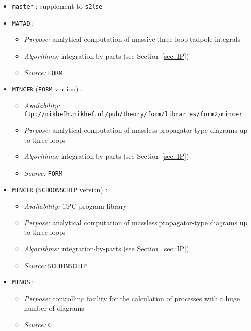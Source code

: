 \begin{itemize}

\item{\tt master} \cite{Bauetal}: supplement to {\tt s2lse}
    

\item {\tt MATAD} \cite{Stediss}:
  \begin{itemize}
  \item {\it Purpose:} analytical computation of massive three-loop tadpole
    integrals
  \item {\it Algorithms:} integration-by-parts (see Section~\ref{sec::IP})
  \item {\it Source:} {\tt FORM}
  \end{itemize}


\item {\tt MINCER} ({\tt FORM} version) \cite{mincer2}:
  \begin{itemize}
  \item {\it Availability:} {\tt
      ftp://nikhefh.nikhef.nl/pub/theory/form/libraries/form2/mincer}
  \item{\it Purpose:} analytical computation of massless propagator-type
    diagrams up to three loops
  \item {\it Algorithms:} integration-by-parts (see Section~\ref{sec::IP})
  \item {\it Source:} {\tt FORM}
  \end{itemize}


\item {\tt MINCER} ({\tt SCHOONSCHIP} version) \cite{MINCER1}:
  \begin{itemize}
  \item {\it Availability:} CPC program library
  \item{\it Purpose:} analytical computation of massless propagator-type
    diagrams up to three loops
  \item {\it Algorithms:} integration-by-parts (see Section~\ref{sec::IP})
  \item {\it Source:} {\tt SCHOONSCHIP}
  \end{itemize}


\item {\tt MINOS} \cite{minos}:
  \begin{itemize}
  \item{\it Purpose:} controlling facility for the calculation of
    processes with a huge number of diagrams
  \item{\it Source:} {\tt C}
  \end{itemize}


\end{itemize}

